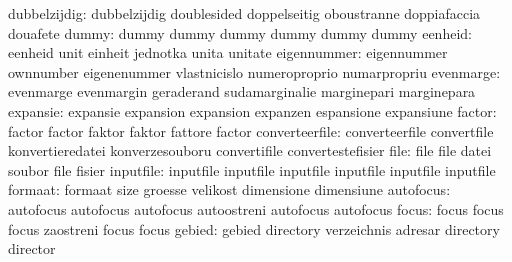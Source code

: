              dubbelzijdig: dubbelzijdig              doublesided
                           doppelseitig              oboustranne
                           doppiafaccia              douafete
                    dummy: dummy                     dummy
                           dummy                     dummy
                           dummy                     dummy
                  eenheid: eenheid                   unit
                           einheit                   jednotka
                           unita                     unitate
              eigennummer: eigennummer               ownnumber
                           eigenenummer              vlastnicislo
                           numeroproprio             numarpropriu
                evenmarge: evenmarge                 evenmargin
                           geraderand                sudamarginalie
                           marginepari               marginepara
                 expansie: expansie                  expansion
                           expansion                 expanzen
                           espansione                expansiune
                   factor: factor                    factor
                           faktor                    faktor
                           fattore                   factor
           converteerfile: converteerfile            convertfile
                           konvertieredatei          konverzesouboru
                           convertifile              convertestefisier
                     file: file                      file
                           datei                     soubor
                           file                      fisier
                inputfile: inputfile                 inputfile
                           inputfile                 inputfile
                           inputfile                 inputfile %
                  formaat: formaat                   size
                           groesse                   velikost
                           dimensione                dimensiune
                autofocus: autofocus                 autofocus
                           autofocus                 autoostreni
                           autofocus                 autofocus
                    focus: focus                     focus
                           focus                     zaostreni
                           focus                     focus %
                   gebied: gebied                    directory
                           verzeichnis               adresar
                           directory                 director
